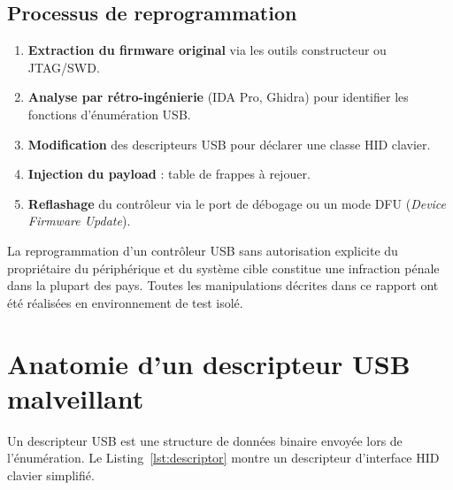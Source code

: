 \documentclass[12pt,a4paper]{report}
\begin{document}
\subsection{Processus de reprogrammation}

\begin{enumerate}
  \item \textbf{Extraction du firmware original} via les outils constructeur ou JTAG/SWD.
  \item \textbf{Analyse par rétro-ingénierie} (IDA Pro, Ghidra) pour identifier les fonctions d'énumération USB.
  \item \textbf{Modification} des descripteurs USB pour déclarer une classe HID clavier.
  \item \textbf{Injection du payload} : table de frappes à rejouer.
  \item \textbf{Reflashage} du contrôleur via le port de débogage ou un mode DFU (\textit{Device Firmware Update}).
\end{enumerate}

\begin{alertbox}
La reprogrammation d'un contrôleur USB sans autorisation explicite du propriétaire du périphérique et du système cible constitue une infraction pénale dans la plupart des pays. Toutes les manipulations décrites dans ce rapport ont été réalisées en environnement de test isolé.
\end{alertbox}

\section{Anatomie d'un descripteur USB malveillant}

Un descripteur USB est une structure de données binaire envoyée lors de l'énumération. Le Listing~\ref{lst:descriptor} montre un descripteur d'interface HID clavier simplifié.
\end{document}
